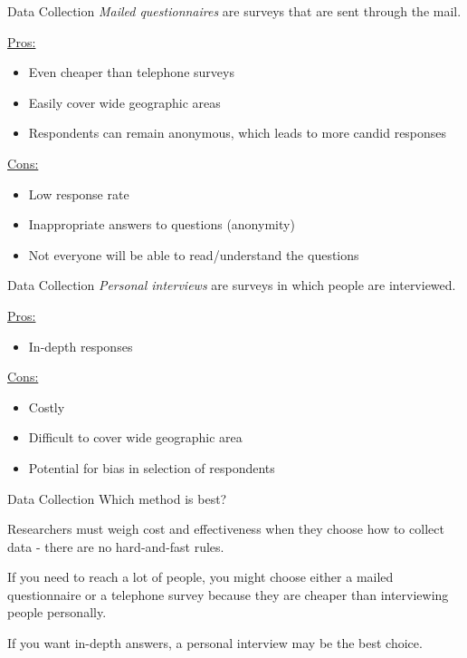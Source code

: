 \documentclass[t]{beamer}
\newcommand{\?}{\stackrel{?}{=}}
\begin{document}
	\begin{frame}{Data Collection}
		\textit{Mailed questionnaires} are surveys that are sent through the mail. \pause
		
		\underline{Pros:} \begin{itemize}
			\item Even cheaper than telephone surveys
			\item Easily cover wide geographic areas
			\item Respondents can remain anonymous, which leads to more candid responses
		\end{itemize} \pause
	
		\underline{Cons:} \begin{itemize}
			\item Low response rate
			\item Inappropriate answers to questions (anonymity)
			\item Not everyone will be able to read/understand the questions
		\end{itemize}
	\end{frame}

	\begin{frame}{Data Collection}
		\textit{Personal interviews} are surveys in which people are interviewed. \pause
		
		\underline{Pros:} \begin{itemize}
			\item In-depth responses
		\end{itemize}
	
		\underline{Cons:} \begin{itemize}
			\item Costly
			\item Difficult to cover wide geographic area
			\item Potential for bias in selection of respondents
		\end{itemize}
	\end{frame}

	\begin{frame}{Data Collection}
		Which method is best? \pause
		
		Researchers must weigh cost and effectiveness when they choose how to collect data - there are no hard-and-fast rules. \pause
		
		If you need to reach a lot of people, you might choose either a mailed questionnaire or a telephone survey because they are cheaper than interviewing people personally.
		
		If you want in-depth answers, a personal interview may be the best choice.
	\end{frame}
\end{document}
